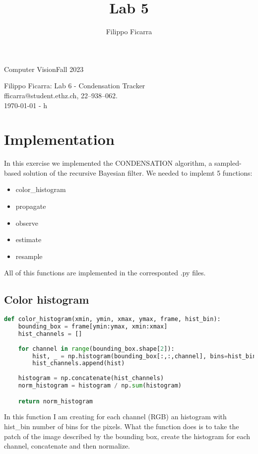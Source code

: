 \documentclass{ETHExercise}
\title{Lab 5}
\author{Filippo Ficarra}
\newcommand{\timestamp}{\ddmmyyyydate\today \,\,- \currenttime h}
\begin{document}
{}
{\Large Computer Vision}{Fall 2023}
\begin{center}
    {\Huge Filippo Ficarra: Lab 6 - Condensation Tracker}\\
      \quad\newline
      fficarra@student.ethz.ch, 22--938--062.\\
      \quad\newline
      \timestamp
      \end{center}



\section{Implementation}
In this exercise we implemented the CONDENSATION algorithm, a sampled-based solution of the recursive Bayesian filter.
We needed to implemt 5 functions:
\begin{itemize}
  \item color\_histogram
  \item propagate
  \item observe
  \item estimate
  \item resample
\end{itemize}
All of this functions are implemented in the corresponted .py files.
\subsection{Color histogram}
\begin{lstlisting}[language=Python, caption=color histogram]
  def color_histogram(xmin, ymin, xmax, ymax, frame, hist_bin):
    bounding_box = frame[ymin:ymax, xmin:xmax]
    hist_channels = []
    
    for channel in range(bounding_box.shape[2]):
        hist, _ = np.histogram(bounding_box[:,:,channel], bins=hist_bin)
        hist_channels.append(hist)
        
    histogram = np.concatenate(hist_channels)
    norm_histogram = histogram / np.sum(histogram)

    return norm_histogram

\end{lstlisting}

In this function I am creating for each channel (RGB)
an histogram with hist\_bin number of bins for the pixels. What the 
function does is to take the patch of the image described by the bounding box,
create the histogram for each channel, concatenate and then normalize.
\end{document}
